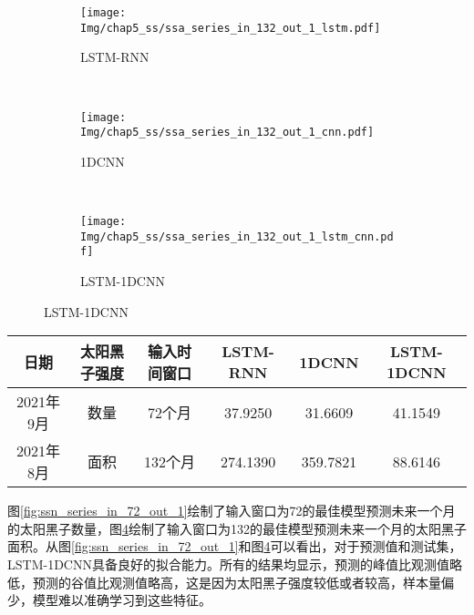 \begin{figure}[!htbp]
  \centering
  \begin{subfigure}[b]{1.0\textwidth}
    \caption{LSTM-RNN} 
    \vspace{-0.35cm}
    \texttt{[image: Img/chap5\_ss/ssa\_series\_in\_132\_out\_1\_lstm.pdf]}
    \label{fig:ssa_series_in_132_out_1_lstm}
  \end{subfigure}    \\
  \vspace{-1cm}
  \begin{subfigure}[b]{1.0\textwidth}
    \caption{1DCNN}
    \vspace{-0.35cm}
    \texttt{[image: Img/chap5\_ss/ssa\_series\_in\_132\_out\_1\_cnn.pdf]}
    \label{fig:ssa_series_in_132_out_1_cnn}
  \end{subfigure} \\
  \vspace{-1cm}
  \begin{subfigure}[b]{1.0\textwidth}
    \caption{LSTM-1DCNN}
    \vspace{-0.35cm}
    \texttt{[image: Img/chap5\_ss/ssa\_series\_in\_132\_out\_1\_lstm\_cnn.pdf]}
    \label{fig:ssa_series_in_132_out_1_lstm_cnn}
    \end{subfigure}
  \vspace{-2cm}
  \label{fig:ssa_series_in_132_out_1}
\end{figure}

\begin{table}[!htbp]
\centering
{}
\label{tab:ss_out_1}
\footnotesize
\begin{tabular}{cccccc}
    \toprule
    日期 & 太阳黑子强度 & 输入时间窗口 & LSTM-RNN & 1DCNN & LSTM-1DCNN  \\
    \midrule
    2021年9月 & 数量 & 72个月 & 37.9250 & 31.6609 & 41.1549 \\
    2021年8月 & 面积 & 132个月 & 274.1390 & 359.7821 & 88.6146 \\
    \bottomrule
\end{tabular}
\end{table}

图\ref{fig:ssn_series_in_72_out_1}绘制了输入窗口为72的最佳模型预测未来一个月的太阳黑子数量，图\ref{fig:ssa_series_in_132_out_1}绘制了输入窗口为132的最佳模型预测未来一个月的太阳黑子面积。从图\ref{fig:ssn_series_in_72_out_1}和图\ref{fig:ssa_series_in_132_out_1}可以看出，对于预测值和测试集，LSTM-1DCNN具备良好的拟合能力。所有的结果均显示，预测的峰值比观测值略低，预测的谷值比观测值略高，这是因为太阳黑子强度较低或者较高，样本量偏少，模型难以准确学习到这些特征。


